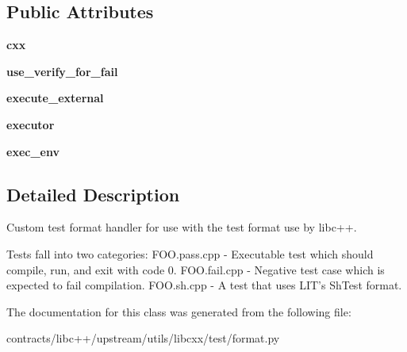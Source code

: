 \subsection*{Public Attributes}
\begin{DoxyCompactItemize}
\item 
\mbox{\label{classlibcxx_1_1test_1_1format_1_1_libcxx_test_format_aa74fe3ad9558b79b0976530b43116f2b}} 
{\bfseries cxx}
\item 
\mbox{\label{classlibcxx_1_1test_1_1format_1_1_libcxx_test_format_aa13bff87319530d45bbb567e3fe2a3d8}} 
{\bfseries use\+\_\+verify\+\_\+for\+\_\+fail}
\item 
\mbox{\label{classlibcxx_1_1test_1_1format_1_1_libcxx_test_format_a8175cc56244cbbbe3d5559eae01085eb}} 
{\bfseries execute\+\_\+external}
\item 
\mbox{\label{classlibcxx_1_1test_1_1format_1_1_libcxx_test_format_a54d43fa81c7973c15d80640b9d1bafd8}} 
{\bfseries executor}
\item 
\mbox{\label{classlibcxx_1_1test_1_1format_1_1_libcxx_test_format_a40e3dd16f69c84f68a6ab7210ff9580a}} 
{\bfseries exec\+\_\+env}
\end{DoxyCompactItemize}


\subsection{Detailed Description}
\begin{DoxyVerb}Custom test format handler for use with the test format use by libc++.

Tests fall into two categories:
  FOO.pass.cpp - Executable test which should compile, run, and exit with
                 code 0.
  FOO.fail.cpp - Negative test case which is expected to fail compilation.
  FOO.sh.cpp   - A test that uses LIT's ShTest format.
\end{DoxyVerb}
 

The documentation for this class was generated from the following file\+:\begin{DoxyCompactItemize}
\item 
contracts/libc++/upstream/utils/libcxx/test/format.\+py\end{DoxyCompactItemize}
